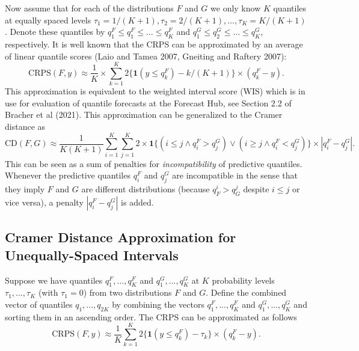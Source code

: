 \documentclass[
]{article}
\begin{document}
Now assume that for each of the distributions \(F\) and \(G\) we only
know \(K\) quantiles at equally spaced levels
\(\tau_1 = 1/(K + 1), \tau_2 = 2/(K + 1), \dots, \tau_K = K/(K + 1)\).
Denote these quantiles by \(q^F_1 \leq q^F_1 \leq \dots \leq q^F_K\) and
\(q^G_1 \leq q^G_2 \leq \dots \leq q^G_K\), respectively. It is well
known that the CRPS can be approximated by an average of linear quantile
scores (Laio and Tamea 2007, Gneiting and Raftery 2007):
\begin{equation}
\text{CRPS}(F, y) \approx \frac{1}{K} \times \sum_{k = 1}^K 2\{\mathbf{1}(y \leq q^F_k) - k/(K + 1)\} \times (q^F_k - y).\label{eq:linear_quantile_scores}
\end{equation} This approximation is equivalent to the weighted interval
score (WIS) which is in use for evaluation of quantile forecasts at the
Forecast Hub, see Section 2.2 of Bracher et al (2021). This
approximation can be generalized to the Cramer distance as
\begin{equation}
\text{CD}(F, G) \approx \frac{1}{K(K + 1)}\sum_{i = 1}^K\sum_{j = 1}^K 2 \times \mathbf{1}\{(i \leq j \land q^F_i > q^G_j) \lor (i \geq j \land q^F_i < q^G_j)\} \times \left| q^F_i - q^G_j\right|. \label{eq:approx_cd}
\end{equation} This can be seen as a sum of penalties for
\textit{incompatibility} of predictive quantiles. Whenever the
predictive quantiles \(q_i^F\) and \(q_j^G\) are incompatible in the
sense that they imply \(F\) and \(G\) are different distributions
(because \(q_F^i > q_G^j\) despite \(i \leq j\) or vice versa), a
penalty \(\left| q^F_i - q^G_j\right|\) is added.

\hypertarget{cramer-distance-approximation-for-unequally-spaced-intervals}{%
\subsection{Cramer Distance Approximation for Unequally-Spaced
Intervals}\label{cramer-distance-approximation-for-unequally-spaced-intervals}}

Suppose we have quantiles \(q_{1}^F,...,q_{K}^F\) and
\(q_{1}^G,...,q_{K}^G\) at \(K\) probability levels
\(\tau_1,...,\tau_K\) (with \(\tau_1=0\)) from two distributions \(F\)
and \(G\). Define the combined vector of quantiles
\(q_1, . . . , q_{2K}\) by combining the vectors \(q_{1}^F,...,q_{K}^F\)
and \(q_{1}^G,...,q_{K}^G\) and sorting them in an ascending order. The
CRPS can be approximated as follows \begin{equation}
\text{CRPS}(F, y) \approx \frac{1}{K}\sum_{k = 1}^K 2\{\mathbf{1}(y \leq q^F_k)-\tau_k\} \times (q^F_k - y) .\label{eq:ls_unqe}
\end{equation}
\end{document}
